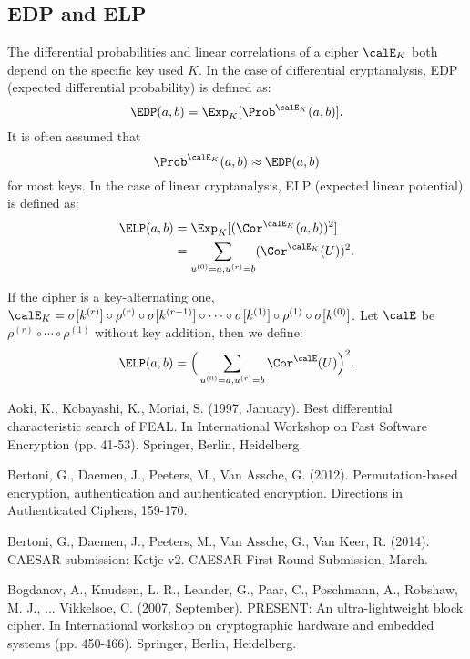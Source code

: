 \subsection{EDP and ELP \cite{DR02}}
The differential probabilities and linear correlations of a cipher $\calE_K$ both depend on the specific key used $K$. In the case of differential cryptanalysis, EDP (expected differential probability) is defined as:
\[
    \EDP(a,b)=\Exp_{K}[\Prob^{\calE_K}(a,b)].
\]
It is often assumed that
\[
    \Prob^{\calE_K}(a,b)\approx\EDP(a,b)
\]
for most keys. In the case of linear cryptanalysis, ELP (expected linear potential) is defined as:
\begin{align*}
    \ELP(a,b)&=\Exp_{K}[(\Cor^{\calE_K}(a,b))^2]\\
    &=\sum\limits_{u^{(0)}=a,u^{(r)}=b}(\Cor^{\calE_K}(U))^2.
\end{align*}
    

If the cipher is a key-alternating one, $\calE_K=\sigma[k^{(r)}]\circ\rho^{(r)}\circ\sigma[k^{(r-1)}]\circ\cdots\circ\sigma[k^{(1)}]\circ\rho^{(1)}\circ\sigma[k^{(0)}]$. Let $\calE$ be $\rho^{(r)}\circ\cdots\circ\rho^{(1)}$ without key addition, then we define:
\[
    \ELP(a,b)=\Big(\sum\limits_{u^{(0)}=a,u^{(r)}=b}\Cor^{\calE}(U)\Big)^2.
\]



Aoki, K., Kobayashi, K.,  Moriai, S. (1997, January). Best differential characteristic search of FEAL. In International Workshop on Fast Software Encryption (pp. 41-53). Springer, Berlin, Heidelberg.

Bertoni, G., Daemen, J., Peeters, M.,  Van Assche, G. (2012). Permutation-based encryption, authentication and authenticated encryption. Directions in Authenticated Ciphers, 159-170.

Bertoni, G., Daemen, J., Peeters, M., Van Assche, G.,  Van Keer, R. (2014). CAESAR submission: Ketje v2. CAESAR First Round Submission, March.

Bogdanov, A., Knudsen, L. R., Leander, G., Paar, C., Poschmann, A., Robshaw, M. J., ...  Vikkelsoe, C. (2007, September). PRESENT: An ultra-lightweight block cipher. In International workshop on cryptographic hardware and embedded systems (pp. 450-466). Springer, Berlin, Heidelberg.

